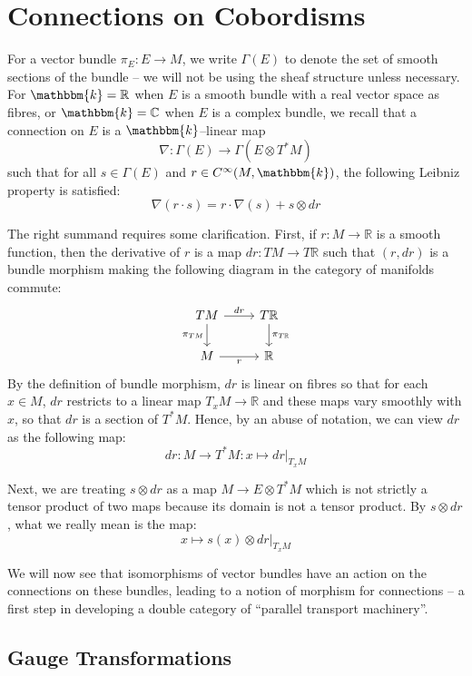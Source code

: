 \documentclass{amsart}
\newcommand{\R}{\mathbb{R}}
\newcommand{\C}{\mathbb{C}}
\newcommand{\K}{\mathbbm{k}}
\newcommand{\tensor}{\otimes}
\renewcommand{\to}[1][]{\stackrel{#1}{\longrightarrow}}
\renewcommand{\mapsto}{\longmapsto}
\newcommand{\Cinf}{C^{\infty}}
\numberwithin{thm}{section}
\theoremstyle{definition}
\begin{document}
%

\section{Connections on Cobordisms}

For a vector bundle $\pi_E : E \to M$, we write $\Gamma(E)$ to denote the set of
smooth sections of the bundle -- we will not be using the sheaf structure unless
necessary. For $\K = \R$ when $E$ is a smooth bundle with a real vector space as
fibres, or $\K = \C$ when $E$ is a complex bundle, we recall that a connection
\cite{Conn} on $E$ is a $\K$--linear map
\[
  \nabla : \Gamma(E) \to \Gamma(E \tensor T^*M)
\]
such that for all $s \in \Gamma(E)$ and $r \in \Cinf(M, \K)$, the following
Leibniz property is satisfied:
\[
  \nabla(r \cdot s) = r \cdot \nabla(s) + s \tensor dr
\]

The right summand requires some clarification.
First, if $r : M \to \R$ is a smooth function, then the derivative of $r$ is a
map $dr : TM \to T\R$ such that $(r, dr)$ is a bundle morphism making the
following diagram in the category of manifolds commute:
\[\begin{tikzcd}
TM \ar[d, "\pi_{TM}" left] \ar[r, "dr" above] & T\R \ar[d, "\pi_{T\R}" right]\\
M \ar[r, "r" below] & \R
\end{tikzcd}\]
By the definition of bundle morphism, $dr$ is linear on fibres so that for each
$x \in M$, $dr$ restricts to a linear map $T_xM \to \R$ and these maps vary
smoothly with $x$, so that $dr$ is a section of $T^*M$. Hence, by an abuse of
notation, we can view $dr$ as the following map:
\[
  dr : M \to T^*M : x \mapsto dr|_{T_xM}
\]

Next, we are treating $s \tensor dr$ as a map $M \to E \tensor T^*M$ which is
not strictly a tensor product of two maps because its domain is not a tensor
product. By $s \tensor dr$, what we really mean is the map:
\begin{equation}\label{eqn:conn_tensor}
  x \mapsto s(x) \tensor dr|_{T_xM}
\end{equation}

We will now see that isomorphisms of vector bundles have an action on the
connections on these bundles, leading to a notion of morphism for connections --
a first step in developing a double category of
``parallel transport machinery''.

% 

\subsection{Gauge Transformations}
\end{document}
